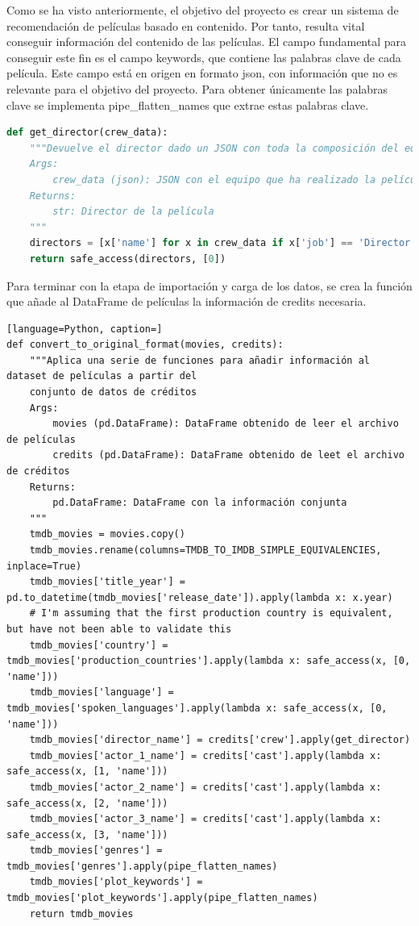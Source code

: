 Como se ha visto anteriormente, el objetivo del proyecto es crear un sistema de recomendación de películas basado en contenido. Por tanto, resulta vital conseguir información del contenido de las películas. El campo fundamental para conseguir este fin es el campo keywords, que contiene las palabras clave de cada película. Este campo está en origen en formato json, con información que no es relevante para el objetivo del proyecto. Para obtener únicamente las palabras clave se implementa pipe\_flatten\_names que extrae estas palabras clave.
\begin{lstlisting}[language=Python, caption= Extracción de las palabras clave a partir del JSON del DataFrame.]
def get_director(crew_data):
    """Devuelve el director dado un JSON con toda la composición del equipo de la película.
    Args:
        crew_data (json): JSON con el equipo que ha realizado la película
    Returns:
        str: Director de la película
    """
    directors = [x['name'] for x in crew_data if x['job'] == 'Director']
    return safe_access(directors, [0])
\end{lstlisting}

Para terminar con la etapa de importación y carga de los datos, se crea la función que añade al DataFrame de películas la información de credits necesaria.
\begin{lstlisting}[language=Python, caption=]
def convert_to_original_format(movies, credits):
    """Aplica una serie de funciones para añadir información al dataset de películas a partir del
    conjunto de datos de créditos
    Args:
        movies (pd.DataFrame): DataFrame obtenido de leer el archivo de películas
        credits (pd.DataFrame): DataFrame obtenido de leet el archivo de créditos
    Returns:
        pd.DataFrame: DataFrame con la información conjunta
    """
    tmdb_movies = movies.copy()
    tmdb_movies.rename(columns=TMDB_TO_IMDB_SIMPLE_EQUIVALENCIES, inplace=True)
    tmdb_movies['title_year'] = pd.to_datetime(tmdb_movies['release_date']).apply(lambda x: x.year)
    # I'm assuming that the first production country is equivalent, but have not been able to validate this
    tmdb_movies['country'] = tmdb_movies['production_countries'].apply(lambda x: safe_access(x, [0, 'name']))
    tmdb_movies['language'] = tmdb_movies['spoken_languages'].apply(lambda x: safe_access(x, [0, 'name']))
    tmdb_movies['director_name'] = credits['crew'].apply(get_director)
    tmdb_movies['actor_1_name'] = credits['cast'].apply(lambda x: safe_access(x, [1, 'name']))
    tmdb_movies['actor_2_name'] = credits['cast'].apply(lambda x: safe_access(x, [2, 'name']))
    tmdb_movies['actor_3_name'] = credits['cast'].apply(lambda x: safe_access(x, [3, 'name']))
    tmdb_movies['genres'] = tmdb_movies['genres'].apply(pipe_flatten_names)
    tmdb_movies['plot_keywords'] = tmdb_movies['plot_keywords'].apply(pipe_flatten_names)
    return tmdb_movies
\end{lstlisting}

